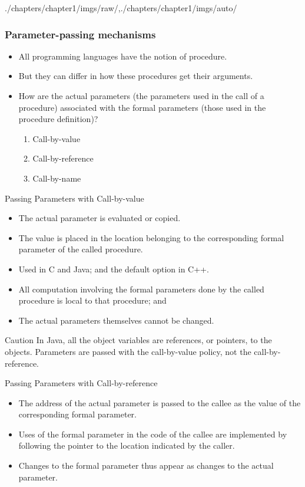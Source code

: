 \begin{graphicspathcontext}{{./chapters/chapter1/imgs/raw/},{./chapters/chapter1/imgs/auto/}}
\begin{bibunit}[apalike]
\subsubsection{Parameter-passing mechanisms}
\begin{frame}{\subsubsecname}
	\begin{itemize}
	\item All programming languages have the notion of procedure.
	\item But they can differ in how these procedures get their arguments.
	\vfill
	\item How are the actual parameters (the parameters used in the call of a procedure) associated with the formal parameters (those used in the procedure definition)?
		\begin{enumerate}
		\item Call-by-value
		\item Call-by-reference
		\item Call-by-name
		\end{enumerate}
	\end{itemize}
\end{frame}

\begin{frame}{{Passing Parameters} with Call-by-value}
	\begin{itemize}
	\item The actual parameter is evaluated or copied.
	\item The value is placed in the location belonging to the corresponding formal parameter of the called procedure.
	\item Used in C and Java; and the default option in C++.
	\item All computation involving the formal parameters done by the called procedure is local to that procedure; and
	\item The actual parameters themselves cannot be changed.
	\end{itemize}
	\begin{alertblock}{Caution}
		In Java, all the object variables are references, or pointers, to the objects. Parameters are passed with the call-by-value policy, not the call-by-reference.
	\end{alertblock}
\end{frame}

\begin{frame}{{Passing Parameters} with Call-by-reference}
	\begin{itemize}
	\item The address of the actual parameter is passed to the callee as the value of the corresponding formal parameter.
	\vfill
	\item Uses of the formal parameter in the code of the callee are implemented by following the pointer to the location indicated by the caller.
	\vfill
	\item Changes to the formal parameter thus appear as changes to the actual parameter.
	\end{itemize}
\end{frame}


\end{bibunit}
\end{graphicspathcontext}
